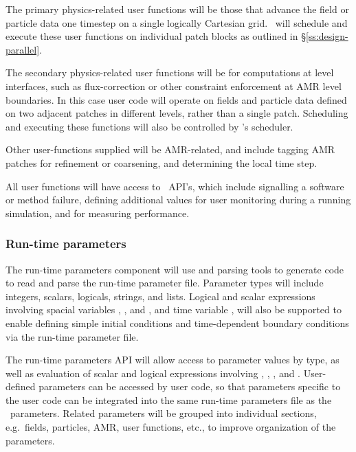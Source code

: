 \documentclass[10pt,twocolumn]{article}
\begin{document}
The primary physics-related user functions will be those that advance
the field or particle data one timestep on a single logically
Cartesian grid.  \cello\ will schedule and execute these user
functions on individual patch blocks as outlined in
\S\ref{ss:design-parallel}.  

The secondary physics-related user functions will be for computations
at level interfaces, such as flux-correction or other constraint
enforcement at AMR level boundaries.  In this case user code will
operate on fields and particle data defined on two adjacent patches in
different levels, rather than a single patch.  Scheduling and
executing these functions will also be controlled by \cello's scheduler.

Other user-functions supplied will be AMR-related, and include tagging
AMR patches for refinement or coarsening, and determining the local
time step.

All user functions will have access to \cello\ API's, which include
signalling a software or method failure, defining additional
values for user monitoring during a running simulation, and for
measuring performance.

\subsubsection{Run-time parameters} \label{sss:design-parameters}

The run-time parameters component will use  and
 parsing tools to generate code to read and parse the
run-time parameter file.  Parameter types will include integers,
scalars, logicals, strings, and lists.  Logical and scalar expressions
involving spacial variables , , and , and time
variable , will also be supported to enable defining simple
initial conditions and time-dependent boundary conditions via the
run-time parameter file.

The run-time parameters API will allow access to parameter values by
type, as well as evaluation of scalar and logical expressions
involving , , , and .  User-defined
parameters can be accessed by user code, so that parameters specific
to the user code can be integrated into the same run-time parameters
file as the \cello\ parameters.  Related parameters will be grouped
into individual sections, e.g.~fields, particles, AMR, user functions,
etc., to improve organization of the parameters.
\end{document}
